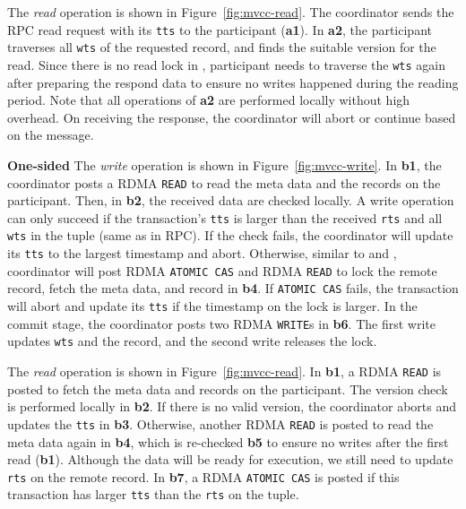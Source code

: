The {\em read} operation is shown in Figure~\ref{fig:mvcc-read}.
The coordinator sends the RPC read request 
with its \texttt{tts} to the participant (\step \textbf{a1}). 
In \step \textbf{a2}, the participant traverses 
all \texttt{wts} of the requested record, and finds the suitable version for the read. Since there is no read lock in \mvcc, 
participant needs to traverse the \texttt{wts} 
again after preparing the respond data to ensure 
no writes happened during the reading period. 
Note that all operations of \textbf{a2} are 
performed locally without high overhead.
On receiving the response, the coordinator will abort
or continue based on the message. 

{\bf One-sided}
The {\em write} operation is shown in Figure~\ref{fig:mvcc-write}. 
In \step \textbf{b1}, the coordinator posts a RDMA \texttt{READ} to read the \mvcc meta data and the records on the participant. Then, in \step \textbf{b2}, the received data are checked locally.
A write operation can only succeed if the transaction's \texttt{tts}
is larger than the received \texttt{rts} and all \texttt{wts} in 
the tuple (same as in RPC).
If the check fails, the coordinator will update its \texttt{tts} to the largest timestamp and abort. 
Otherwise, similar to \nowait and \waitdie,
coordinator will post RDMA \texttt{ATOMIC CAS} and RDMA \texttt{READ} to lock the remote record, fetch the meta data, and record in \textbf{b4}. 
If \texttt{ATOMIC CAS} fails, the transaction will abort and update its \texttt{tts} if the timestamp on the lock is larger. 
In the commit stage, the coordinator posts two RDMA \texttt{WRITE}s in \step \textbf{b6}. 
The first write updates \texttt{wts} and the record, and
the second write releases the lock.

The {\em read} operation is shown in Figure~\ref{fig:mvcc-read}. In \step \textbf{b1}, a RDMA \texttt{READ} is posted to fetch the meta data and records on the participant. 
The version check is performed locally in \textbf{b2}. If there is no valid version, the coordinator aborts and updates the \texttt{tts} in \textbf{b3}. Otherwise, 
another RDMA \texttt{READ} is posted to read the meta data again in \textbf{b4}, which is re-checked \textbf{b5} 
to ensure no writes after the first read (\textbf{b1}).
Although the data will be ready for execution,
we still need to update \texttt{rts} on the remote record. 
In \step \textbf{b7}, a RDMA \texttt{ATOMIC CAS} 
is posted if this transaction has larger \texttt{tts}
than the \texttt{rts} on the tuple.

